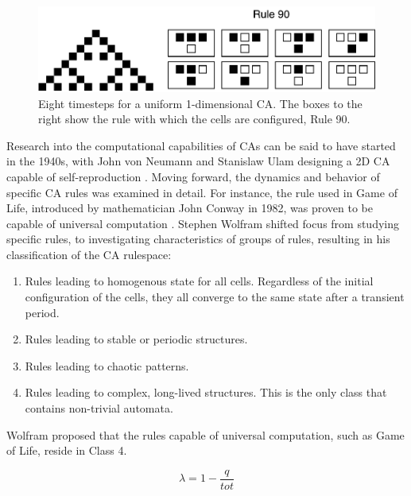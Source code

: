 \begin{figure}[ht]
  \centering
  \includegraphics[width=0.6\linewidth]{fig/ca-example}
  \caption[Simulation of uniform, 1-dimensional CA]{
    Eight timesteps for a uniform 1-dimensional CA. The boxes to the right show
    the rule with which the cells are configured, Rule 90.
  }
  \label{fig:ca-example}
\end{figure}

Research into the computational capabilities of CAs can be said to have started
in the 1940s, with John von Neumann and Stanislaw Ulam designing a 2D CA capable
of self-reproduction \cite{Sipper1999}. Moving forward, the dynamics and
behavior of specific CA rules was examined in detail. For instance, the rule
used in Game of Life, introduced by mathematician John Conway in 1982, was
proven to be capable of universal computation \cite{Connelly1986}. Stephen
Wolfram shifted focus from studying specific rules, to investigating
characteristics of groups of rules, resulting in his classification of the CA
rulespace:

\begin{enumerate}
  \item Rules leading to homogenous state for all cells. Regardless of the
    initial configuration of the cells, they all converge to the same state
    after a transient period.
  \item Rules leading to stable or periodic structures.
  \item Rules leading to chaotic patterns.
  \item Rules leading to complex, long-lived structures. This is the only class
    that contains non-trivial automata.
\end{enumerate}

Wolfram proposed that the rules capable of universal computation, such as Game
of Life, reside in Class 4.

\begin{equation}
  \label{eqn:lambda}
  \lambda = 1 - \frac{q}{tot}
\end{equation}

